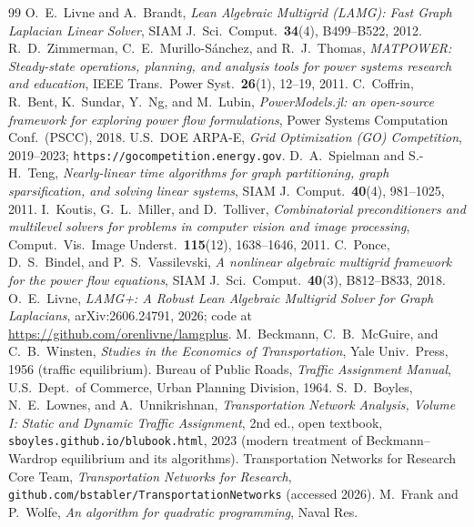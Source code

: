 \documentclass{siamart220329}
\begin{document}
\begin{thebibliography}{99}
\footnotesize\setlength{\itemsep}{0.2ex}
 O.~E.~Livne and A.~Brandt, \emph{Lean Algebraic Multigrid (LAMG): Fast Graph
Laplacian Linear Solver}, SIAM J.\ Sci.\ Comput.\ \textbf{34}(4), B499--B522, 2012.
 R.~D.~Zimmerman, C.~E.~Murillo-S\'anchez, and R.~J.~Thomas, \emph{MATPOWER:
Steady-state operations, planning, and analysis tools for power systems research and education},
IEEE Trans.\ Power Syst.\ \textbf{26}(1), 12--19, 2011.
 C.~Coffrin, R.~Bent, K.~Sundar, Y.~Ng, and M.~Lubin, \emph{PowerModels.jl: an
open-source framework for exploring power flow formulations}, Power Systems Computation Conf.\ (PSCC),
2018.
 U.S.\ DOE ARPA-E, \emph{Grid Optimization (GO) Competition}, 2019--2023;
\texttt{https://gocompetition.energy.gov}.
 D.~A.~Spielman and S.-H.~Teng, \emph{Nearly-linear time algorithms for graph
partitioning, graph sparsification, and solving linear systems}, SIAM J.\ Comput.\ \textbf{40}(4),
981--1025, 2011.
 I.~Koutis, G.~L.~Miller, and D.~Tolliver, \emph{Combinatorial preconditioners and
multilevel solvers for problems in computer vision and image processing}, Comput.\ Vis.\ Image
Underst.\ \textbf{115}(12), 1638--1646, 2011.
 C.~Ponce, D.~S.~Bindel, and P.~S.~Vassilevski, \emph{A nonlinear algebraic
multigrid framework for the power flow equations}, SIAM J.\ Sci.\ Comput.\ \textbf{40}(3), B812--B833,
2018.
 O.~E.~Livne, \emph{LAMG+: A Robust Lean Algebraic Multigrid Solver for Graph
Laplacians}, arXiv:2606.24791, 2026; code at \url{https://github.com/orenlivne/lamgplus}.
 M.~Beckmann, C.~B.~McGuire, and C.~B.~Winsten, \emph{Studies in the Economics of
Transportation}, Yale Univ.\ Press, 1956 (traffic equilibrium).
 Bureau of Public Roads, \emph{Traffic Assignment Manual}, U.S.\ Dept.\ of Commerce,
Urban Planning Division, 1964.
 S.~D.~Boyles, N.~E.~Lownes, and A.~Unnikrishnan, \emph{Transportation Network
Analysis, Volume I: Static and Dynamic Traffic Assignment}, 2nd ed., open textbook,
\texttt{sboyles.github.io/blubook.html}, 2023 (modern treatment of Beckmann--Wardrop equilibrium and
its algorithms).
 Transportation Networks for Research Core Team, \emph{Transportation Networks for
Research}, \texttt{github.com/bstabler/TransportationNetworks} (accessed 2026).
 M.~Frank and P.~Wolfe, \emph{An algorithm for quadratic programming}, Naval Res.\

\end{thebibliography}
\end{document}
